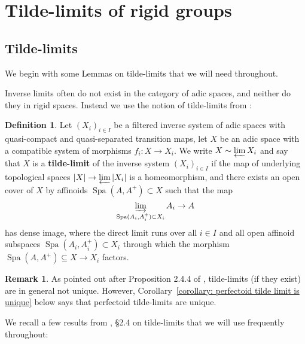 \documentclass[10pt,oneside]{amsart}
\theoremstyle{definition}
\newtheorem{definition}[theorem]{Definition}
\newtheorem{remark}[theorem]{Remark}
\begin{document}
	\section{Tilde-limits of rigid groups} \label{section:tilde_limit}
  
	

		\subsection{Tilde-limits} 
	We begin with some Lemmas on tilde-limits that we will need throughout.
		
	Inverse limits often do not exist in the category of adic spaces, and neither do they in rigid spaces. Instead we use the notion of tilde-limits from \cite[Definition 2.4.2]{Hubers-book}:	
	\begin{definition} 
Let $(X_i)_{i\in I}$ be a filtered inverse system of adic spaces with quasi-compact and quasi-separated transition maps, let $X$ be an adic space with a compatible system of morphisms $f_i: X \rightarrow X_i$. We write $X \sim \varprojlim X_i$ and say that $X$ is a \textbf{tilde-limit} of the inverse system $(X_i)_{i\in I}$ if the map of underlying topological spaces $|X| \rightarrow \varprojlim |X_i|$ is a homeomorphism, and there exists an open cover of $X$ by affinoids $\operatorname{Spa} (A, A^+) \subset X$ such that the map 
$$ \varinjlim_{\operatorname{Spa}(A_i, A_i^+) \subset X_i} A_i \rightarrow A$$
has dense image, where the direct limit runs over all $i\in I$ and all open affinoid subspaces $\operatorname{Spa}(A_i, A_i^+) \subset X_i$ through which the morphism $\operatorname{Spa}(A, A^+) \subseteq X\rightarrow X_i$ factors.
	\end{definition}
	
	\begin{remark} \label{remark:tilde_limit_non_unique}
As pointed out after Proposition 2.4.4 of \cite{SW}, tilde-limits (if they exist) are in general not unique. However, Corollary~\ref{corollary: perfectoid tilde limit is unique} below says that perfectoid tilde-limits are unique.
	\end{remark}

We recall a few results from \cite{SW}, \S2.4 on tilde-limits that we will use frequently throughout:
\end{document}
